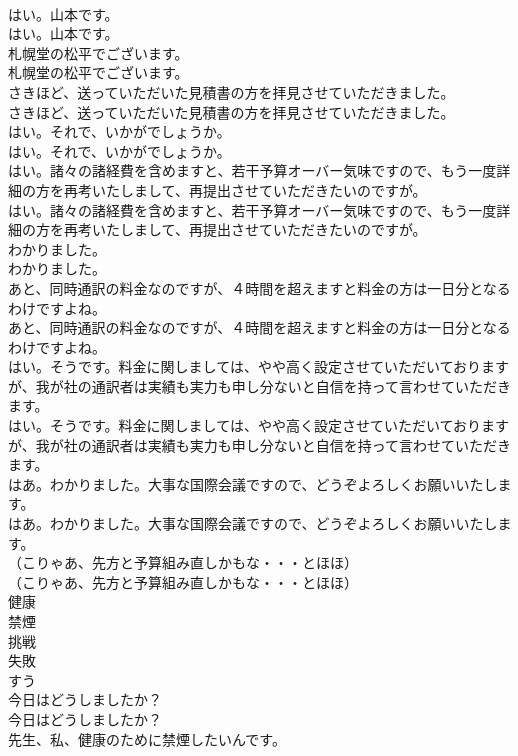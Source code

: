 \documentclass[8pt]{extreport}
\begin{document}
\begin{CJK}{UTF8}{min}
\\	はい。山本です。	
\\	はい。山本です。 
\\	札幌堂の松平でございます。	
\\	札幌堂の松平でございます。 
\\	さきほど、送っていただいた見積書の方を拝見させていただきました。	
\\	さきほど、送っていただいた見積書の方を拝見させていただきました。 
\\	はい。それで、いかがでしょうか。	
\\	はい。それで、いかがでしょうか。 
\\	はい。諸々の諸経費を含めますと、若干予算オーバー気味ですので、もう一度詳細の方を再考いたしまして、再提出させていただきたいのですが。	
\\	はい。諸々の諸経費を含めますと、若干予算オーバー気味ですので、もう一度詳細の方を再考いたしまして、再提出させていただきたいのですが。 
\\	わかりました。	
\\	わかりました。 
\\	あと、同時通訳の料金なのですが、４時間を超えますと料金の方は一日分となるわけですよね。	
\\	あと、同時通訳の料金なのですが、４時間を超えますと料金の方は一日分となるわけですよね。 
\\	はい。そうです。料金に関しましては、やや高く設定させていただいておりますが、我が社の通訳者は実績も実力も申し分ないと自信を持って言わせていただきます。	
\\	はい。そうです。料金に関しましては、やや高く設定させていただいておりますが、我が社の通訳者は実績も実力も申し分ないと自信を持って言わせていただきます。 
\\	はあ。わかりました。大事な国際会議ですので、どうぞよろしくお願いいたします。	
\\	はあ。わかりました。大事な国際会議ですので、どうぞよろしくお願いいたします。 
\\	（こりゃあ、先方と予算組み直しかもな・・・とほほ）	
\\	（こりゃあ、先方と予算組み直しかもな・・・とほほ） 
\\	健康
\\	禁煙
\\	挑戦
\\	失敗
\\	すう
\\	今日はどうしましたか？	
\\	今日はどうしましたか？ 
\\	先生、私、健康のために禁煙したいんです。	

\end{CJK}
\end{document}
